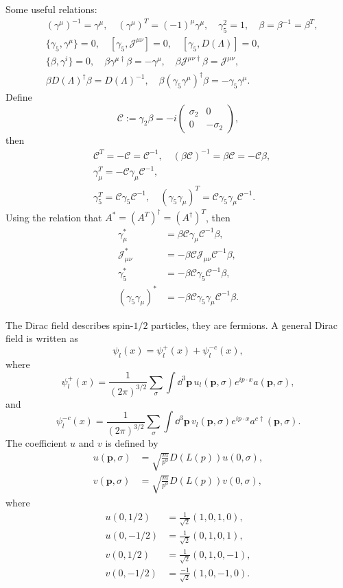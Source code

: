 \documentclass[9pt]{extbook}
\begin{document}
Some useful relations:
\[
\begin{split}
	&(\gamma^{\mu})^{-1}=\gamma^{\mu},\quad (\gamma^\mu)^T=(-1)^\mu \gamma^\mu, \quad \gamma_5^2=1,\quad \beta=\beta^{-1}=\beta^T,\\
	&\{\gamma_5,\gamma^\mu\}=0,\quad [\gamma_5,\mathscr{J}^{\mu\nu}]=0,\quad [\gamma_5,D(\Lambda)]=0,\\
	&\{\beta,\gamma^i\}=0,\quad\beta \gamma^{\mu\dag}\beta=-\gamma^{\mu},\quad \beta \mathscr{J}^{\mu\nu\dag}\beta=\mathscr{J}^{\mu\nu},\\
	&\beta D(\Lambda)^\dag \beta=D(\Lambda)^{-1}, \quad \beta (\gamma_5\gamma^{\mu})^\dag\beta=-\gamma_5\gamma^{\mu}.
\end{split}
\]
Define 
\[
	\mathscr{C}:=\gamma_2\beta=-i \begin{pmatrix}
		\sigma_2&0\\
		0&-\sigma_2
	\end{pmatrix},
\]
then 
\[
\begin{split}
	&\mathscr{C}^T=-\mathscr{C}=\mathscr{C}^{-1},\quad (\beta\mathscr{C})^{-1}=\beta\mathscr{C}=-\mathscr{C}\beta,\\
	&\gamma_\mu^T=-\mathscr{C}\gamma_\mu \mathscr{C}^{-1},\\
	&\gamma_5^T=\mathscr{C}\gamma_5 \mathscr{C}^{-1},\quad (\gamma_5\gamma_\mu)^T=\mathscr{C}\gamma_5\gamma_\mu \mathscr{C}^{-1}.
\end{split}
\]
Using the relation that $A^*=(A^T)^\dag=(A^\dag)^T$, then 
\[
\begin{split}
	\gamma_\mu^*&=\beta\mathscr{C}\gamma_\mu \mathscr{C}^{-1} \beta,\\
	\mathscr{J}_{\mu\nu}^*&=-\beta\mathscr{C}\mathscr{J}_{\mu\nu} \mathscr{C}^{-1} \beta,\\
	\gamma_5^*&=-\beta\mathscr{C}\gamma_5 \mathscr{C}^{-1}\beta,\\
	(\gamma_5\gamma_\mu)^*&=-\beta\mathscr{C}\gamma_5\gamma_\mu \mathscr{C}^{-1}\beta.
\end{split}
\]

The Dirac field describes spin-$1/2$ particles, they are fermions. A general Dirac field is written as
\[
	\psi_l(x)=\psi^+_l(x)+\psi^{-c}_l(x),
\]
where
\[
	\psi^+_l(x)=\frac{1}{(2\pi)^{3/2}}\sum_\sigma\int \dd^3\bm{p}\,u_l(\bm{p},\sigma)e^{ip\cdot x}a(\bm{p},\sigma),
\]
and
\[
	\psi^{-c}_l(x)=\frac{1}{(2\pi)^{3/2}}\sum_\sigma\int \dd^3\bm{p}\,v_l(\bm{p},\sigma)e^{ip\cdot x}a^{c\dag}(\bm{p},\sigma).
\]
The coefficient $u$ and $v$ is defined by
\begin{align*}
	u(\bm{p},\sigma)&=\sqrt{\frac{m}{p^0}}D(L(p))u(0,\sigma),\\
	v(\bm{p},\sigma)&=\sqrt{\frac{m}{p^0}}D(L(p))v(0,\sigma),
\end{align*}
where
\begin{align*}
	u(0,1/2)&=\frac{1}{\sqrt{2}}(1,0,1,0),\\
	u(0,-1/2)&=\frac{1}{\sqrt{2}}(0,1,0,1),\\
	v(0,1/2)&=\frac{1}{\sqrt{2}}(0,1,0,-1),\\
	v(0,-1/2)&=\frac{-1}{\sqrt{2}}(1,0,-1,0).
\end{align*}
\end{document}
